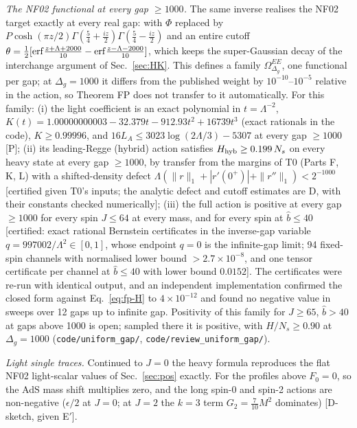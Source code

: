 \emph{The NF02 functional at every gap $\ge1000$.} The same inverse realises the NF02 target exactly at every real gap: with $\Phi$
replaced by $P\cosh(\pi z/2)\Gamma(\frac54+\frac{iz}2)\Gamma(\frac54-\frac{iz}2)$ and an entire cutoff
$\theta=\frac12[{\rm erf}\frac{z+\Lambda+2000}{10}-{\rm erf}\frac{z-\Lambda-2000}{10}]$, which keeps the super-Gaussian decay of the
interchange argument of Sec.~\ref{sec:HK}. This defines a family $\Omega^{EE}_{\Delta_g}$, one functional per gap; at $\Delta_g=1000$ it
differs from the published weight by $10^{-10}$--$10^{-5}$ relative in the action, so Theorem FP does not transfer to it automatically.
For this family: (i) the light coefficient is an exact polynomial in $t=\Lambda^{-2}$, $K(t)=1.00000000003-32.379t-912.93t^2+16739t^3$
(exact rationals in the code), $K\ge0.99996$, and $16L_A\le3023\log(2\Lambda/3)-5307$ at every gap $\ge1000$ [P]; (ii) its leading-Regge
(hybrid) action satisfies $H_{\rm hyb}\ge0.199\,N_s$ on every heavy state at every gap $\ge1000$, by transfer from the margins of T0
(Parts F, K, L) with a shifted-density defect $\Lambda(\|r\|_1+|r'(0^+)|+\|r''\|_1)<2^{-1000}$ [certified given T0's inputs; the
analytic defect and cutoff estimates are D, with their constants checked numerically]; (iii) the full action is positive at every gap
$\ge1000$ for every spin $J\le64$ at every mass, and for every spin at $\hat b\le40$ [certified: exact rational Bernstein certificates
in the inverse-gap variable $q=997002/\Lambda^2\in[0,1]$, whose endpoint $q=0$ is the infinite-gap limit; 94 fixed-spin channels with
normalised lower bound $>2.7\times10^{-8}$, and one tensor certificate per channel at $\hat b\le40$ with lower bound $0.0152$]. The
certificates were re-run with identical output, and an independent implementation confirmed the closed form against
Eq.~\eqref{eq:fp-H} to $4\times10^{-12}$ and found no negative value in sweeps over 12 gaps up to infinite gap. Positivity of this
family for $J\ge65$, $\hat b>40$ at gaps above 1000 is open; sampled there it is positive, with $H/N_s\ge0.90$ at $\Delta_g=1000$
(\texttt{code/uniform\_gap/}, \texttt{code/review\_uniform\_gap/}).

\emph{Light single traces.} Continued to $J=0$ the heavy formula reproduces the flat NF02 light-scalar values of Sec.~\ref{sec:pos}
exactly. For the profiles above $F_0=0$, so the AdS mass shift multiplies zero, and the long spin-0 and spin-2 actions are
non-negative ($\epsilon/2$ at $J=0$; at $J=2$ the $k=3$ term $G_2=\frac7{10}M^2$ dominates) [D-sketch, given E$'$].
